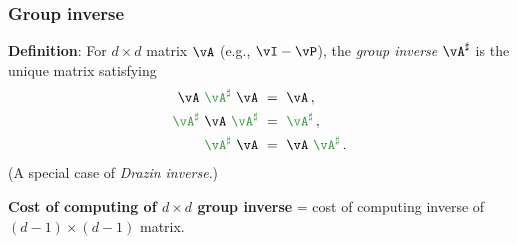 \documentclass[11pt,compress,blue4,notheorems]{beamer}
\newcommand{\GREEN}[1]{\textcolor{boldgreen}{#1}}
\begin{document}

\begin{frame}
  \frametitle{Group inverse}

  \textbf{Definition}:
  For $d{\times}d$ matrix $\vA$ (e.g., $\vI - \vP$), the
  \GREEN{\emph{group inverse $\vA^\sharp$}} is the unique matrix
  satisfying
  \begin{align*}
    \vA \ \GREEN{\vA^\sharp} \ \vA & \ = \ \vA
    \,,
    \\
    \GREEN{\vA^\sharp} \ \vA \ \GREEN{\vA^\sharp} & \ = \ \GREEN{\vA^\sharp}
    \,,
    \\
    \GREEN{\vA^\sharp} \ \vA & \ = \ \vA \ \GREEN{\vA^\sharp}
    \,.
  \end{align*}
  (A special case of \emph{Drazin inverse}.)

  \bigskip
  \textbf{Cost of computing of $d{\times}d$ group inverse} = cost of
  computing inverse of $(d{-}1){\times}(d{-}1)$ matrix.

\end{frame}

\end{document}
